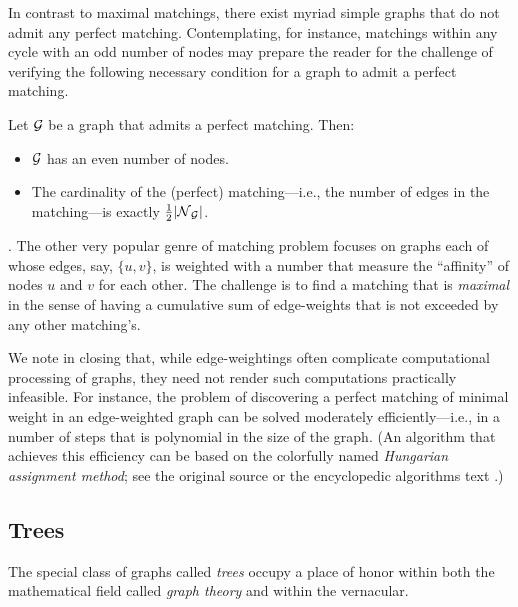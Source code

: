 \medskip

In contrast to maximal matchings, there exist myriad simple graphs
that do not admit any perfect matching.  Contemplating, for instance,
matchings within any cycle with an odd number of nodes may prepare the
reader for the challenge of verifying the following necessary
condition for a graph to admit a perfect matching.

\begin{prop}
\label{thm:necessary-for-perfect-matching}
Let $\mbox{$\cal G$}$ be a graph that admits a perfect matching.  Then:
\begin{itemize}
\item
$\mbox{$\cal G$}$ has an even number of nodes.
\item
The cardinality of the (perfect) matching---i.e., the number of edges
in the matching---is exactly
$\frac{1}{2}|\mbox{$\cal N$}_{\mbox{{\scriptsize $\cal G$}}}|$.
\end{itemize}
\end{prop}


\bigskip

.
The other very popular genre of matching problem focuses on graphs
each of whose edges, say, $\{u,v\}$, is weighted with a number that
measure the ``affinity'' of  nodes $u$ and $v$ for each other.  The
challenge is to find a matching that is {\em maximal}
 in the sense of having a cumulative
sum of edge-weights that is not exceeded by any other matching's.

We note in closing that, while edge-weightings often complicate
computational processing of graphs, they need not render such
computations practically infeasible.  For instance, the problem of
discovering a perfect matching of minimal weight in an edge-weighted
graph can be solved moderately efficiently---i.e., in a number of
steps that is polynomial in the size of the graph.  (An algorithm that
achieves this efficiency can be based on the colorfully named {\it
  Hungarian assignment method};   see the
original source \cite{Kuhn55} or the encyclopedic algorithms text
\cite{CLRS}.)

\subsection{Trees}
\label{sec:Trees}

The special class of graphs called {\it trees} 
 occupy a place of honor within both the mathematical
field called {\it graph theory} and within the vernacular.

